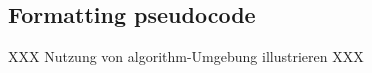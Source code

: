 \documentclass[british]{emisa}
\begin{document}
\begin{article}
\section{Formatting pseudocode}\label{sec:algorithm}
XXX Nutzung von algorithm-Umgebung illustrieren XXX 



%



\end{article}
\end{document}

